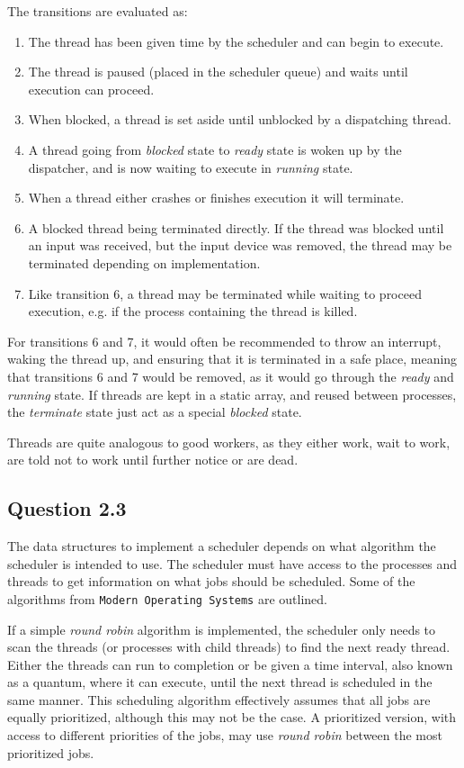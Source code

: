 The transitions are evaluated as:
\begin{enumerate}
    \item The thread has been given time by the scheduler and can begin to execute.
    \item The thread is paused (placed in the scheduler queue) and waits until execution can proceed.
    \item When blocked, a thread is set aside until unblocked by a dispatching thread.
    \item A thread going from \textit{blocked} state to \textit{ready} state is woken up by the dispatcher, and is now waiting to execute in \textit{running} state.
    \item When a thread either crashes or finishes execution it will terminate.
    \item A blocked thread being terminated directly. If the thread was blocked until an input was received, but the input device was removed, the thread may be terminated depending on implementation.
    \item Like transition 6, a thread may be terminated while waiting to proceed execution, e.g. if the process containing the thread is killed.
\end{enumerate}

For transitions 6 and 7, it would often be recommended to throw an interrupt, waking the thread up, and ensuring that it is terminated in a safe place, meaning that transitions 6 and 7 would be removed, as it would go through the \textit{ready} and \textit{running} state. If threads are kept in a static array, and reused between processes, the \textit{terminate} state just act as a special \textit{blocked} state. 

Threads are quite analogous to good workers, as they either work, wait to work, are told not to work until further notice or are dead.

\subsection*{Question 2.3}
The data structures to implement a scheduler depends on what algorithm the scheduler is intended to use. The scheduler must have access to the processes and threads to get information on what jobs should be scheduled. Some of the algorithms from \texttt{Modern Operating Systems} are outlined.

If a simple \textit{round robin} algorithm is implemented, the scheduler only needs to scan the threads (or processes with child threads) to find the next ready thread. Either the threads can run to completion or be given a time interval, also known as a quantum, where it can execute, until the next thread is scheduled in the same manner. This scheduling algorithm effectively assumes that all jobs are equally prioritized, although this may not be the case. A prioritized version, with access to different priorities of the jobs, may use \textit{round robin} between the most prioritized jobs.

